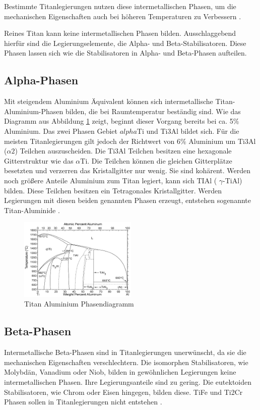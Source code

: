 \documentclass[a4paper, 11pt]{tubsreprt}
\begin{document}
Bestimmte Titanlegierungen nutzen diese intermetallischen Phasen, um die mechanischen Eigenschaften auch bei höheren Temperaturen zu Verbessern \cite{Luetjering2007}.

Reines Titan kann keine intermetallischen Phasen bilden. Ausschlaggebend hierfür sind die Legierungselemente, die Alpha- und Beta-Stabilisatoren. Diese Phasen lassen sich wie die Stabilisatoren  in Alpha- und Beta-Phasen aufteilen.  
\subsection{Alpha-Phasen}
Mit steigendem Aluminium Äquivalent können sich intermetallische Titan-Aluminium-Phasen bilden, die bei Raumtemperatur beständig sind. Wie das Diagramm aus Abbildung \ref{Ti-Al-Phasendiagramm} zeigt, beginnt dieser Vorgang bereits bei ca. 5\% Aluminium. Das zwei Phasen Gebiet $alpha$Ti und Ti3Al bildet sich. Für die meisten Titanlegierungen gilt jedoch der Richtwert von 6\% Aluminium um Ti3Al ($\alpha2$) Teilchen auszuscheiden. Die Ti3Al Teilchen besitzen eine hexagonale Gitterstruktur wie das $\alpha$Ti. Die Teilchen können die gleichen Gitterplätze besetzten und verzerren das Kristallgitter nur wenig. Sie sind kohärent.
Werden noch größere Anteile Aluminium zum Titan legiert, kann sich TIAl ( $\gamma$-TiAl) bilden. Diese Teilchen besitzen ein Tetragonales Kristallgitter.
 Werden Legierungen mit diesen beiden genannten Phasen erzeugt, entstehen sogenannte Titan-Aluminide \cite[vgl.]{Luetjering2007}.   
 
\begin{figure}
\centering
\includegraphics[width=0.5\textwidth]{Bilder/Titanaluminide.png}
\caption{Titan Aluminium Phasendiagramm}
\label{Ti-Al-Phasendiagramm}
\end{figure}

\subsection{Beta-Phasen}
Intermetallische Beta-Phasen sind in Titanlegierungen unerwünscht, da sie die mechanischen Eigenschaften verschlechtern. Die isomorphen Stabilisatoren, wie Molybdän, Vanadium oder Niob, bilden in gewöhnlichen Legierungen keine intermetallischen Phasen. Ihre Legierungsanteile sind zu gering. Die eutektoiden Stabilisatoren, wie Chrom oder Eisen hingegen, bilden diese. TiFe und Ti2Cr Phasen sollen in Titanlegierungen nicht entstehen \cite{Luetjering2007}.
\end{document}
